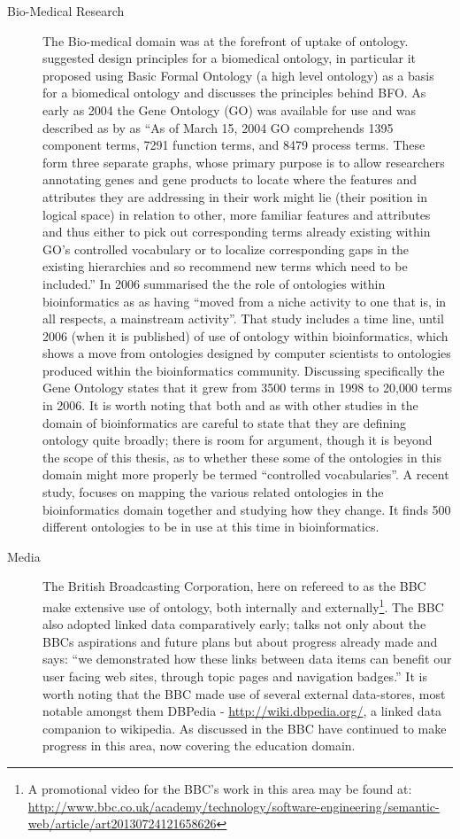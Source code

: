 \begin{description}
	\item[Bio-Medical Research]  
	The Bio-medical domain was at the forefront of uptake of ontology. \cite{Grenon2004} suggested design principles for a biomedical ontology, in particular it proposed using Basic Formal Ontology (a high level ontology) as a basis for a biomedical ontology and discusses the principles behind BFO. As early as 2004 the Gene Ontology (GO) was available for use and was described as by \cite{Smith2004} as ``As of March 15, 2004 GO comprehends 1395 component terms, 7291 function terms, and 8479 process terms. These form three separate graphs, whose primary purpose is to allow researchers annotating genes and gene products to locate where the features and attributes they are addressing in their work might lie (their position in logical space) in relation to other, more familiar features and attributes and thus either to pick out corresponding terms already existing within GO’s controlled vocabulary or to localize corresponding gaps in the existing hierarchies and so recommend new terms which need to be included.'' In 2006 \cite{Bodenreider2006} summarised the the role of ontologies within bioinformatics as as having ``moved from a niche activity to one that is, in all respects, a mainstream activity''. That study includes a time line, until 2006 (when it is published) of use of ontology within bioinformatics, which shows a move from ontologies designed by computer scientists to ontologies produced within the bioinformatics community. Discussing specifically the Gene Ontology \cite{Bodenreider2006} states that it grew from 3500 terms in 1998 to 20,000 terms in 2006. It is worth noting that both \cite{Bodenreider2006} and \cite{Gro2016} as with other studies in the domain of bioinformatics are careful to state that they are defining ontology quite broadly; there is room for argument, though it is beyond the scope of this thesis, as to whether these some of the ontologies in this domain might more properly be termed ``controlled vocabularies''. A recent study, \cite{Gro2016} focuses on mapping the various related ontologies in the bioinformatics domain together and studying how they change. It finds 500 different ontologies to be in use at this time in bioinformatics.
    \item[Media]    
    The British Broadcasting Corporation, here on refereed to as the BBC make extensive use of ontology, both internally and externally\footnote{A promotional video  for the BBC's work in this area may be found at: \url{http://www.bbc.co.uk/academy/technology/software-engineering/semantic-web/article/art20130724121658626}}. The BBC also adopted linked data comparatively early; \cite{Geo09} talks not only about the BBCs aspirations and future plans but about progress already made and says: ``we demonstrated how these links between data items can benefit our user facing web sites, through topic pages and navigation badges.'' It is worth noting that the BBC made use of several external data-stores, most notable amongst them DBPedia - \url{http://wiki.dbpedia.org/}, a linked data companion to wikipedia. As discussed in \cite{Mikroyannidi2016} the BBC have continued to make progress in this area, now covering the education domain.  

\end{description}
